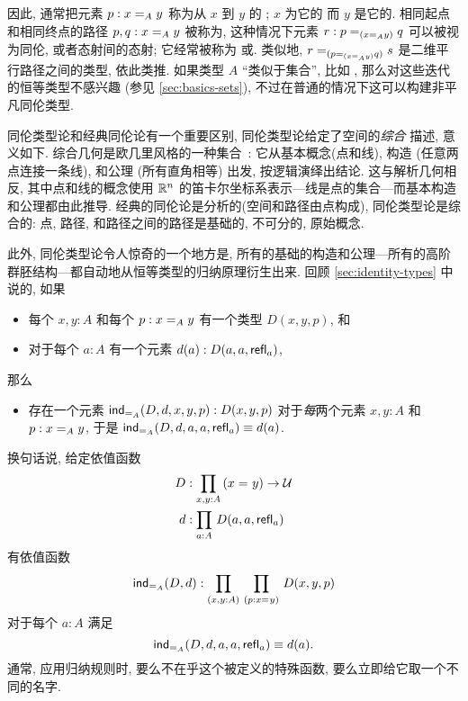 因此, 通常把元素 $p : \id[A]{x}{y}$ 称为从 $x$ 到 $y$ 的 ;
%
$x$ 为它的%
%
%
而 $y$ 是它的.
%
%
相同起点和相同终点的路径 $p,q : \id[A]{x}{y}$ 被称为,
%
%
这种情况下元素 $r : \id[{(\id[A]{x}{y})}]{p}{q}$ 可以被视为同伦, 或者态射间的态射;
它经常被称为%
%
%
或.
%
%
%
类似地, $\id[{(\id[{(\id[A]{x}{y})}]{p}{q})}]{r}{s}$ 是二维平行路径之间的类型,
%
依此类推.
如果类型 $A$ ``类似于集合'', 比如 \nat, 那么对这些迭代的恒等类型不感兴趣 (参见 \cref{sec:basics-sets}), 不过在普通的情况下这可以构建非平凡同伦类型.


同伦类型论和经典同伦论有一个重要区别, 同伦类型论给定了空间的\emph{综合}%
%
%
%
描述, 意义如下.
综合几何是欧几里风格的一种集合~\cite{Euclid}: 它从基本概念(点和线), 构造 (任意两点连接一条线), 和公理 (所有直角相等) 出发, 按逻辑演绎出结论.
这与解析几何相反,
%
其中点和线的概念使用 $\R^n$ 的笛卡尔坐标系表示---线是点的集合---而基本构造和公理都由此推导.
经典的同伦论是分析的(空间和路径由点构成), 同伦类型论是综合的: 点, 路径, 和路径之间的路径是基础的, 不可分的, 原始概念.

此外, 同伦类型论令人惊奇的一个地方是, 所有的基础的构造和公理---所有的高阶群胚结构---都自动地从恒等类型的归纳原理衍生出来.
回顾 \cref{sec:identity-types} 中说的, 如果
\begin{itemize}
    \item 每个 $x,y:A$ 和每个 $p:\id[A]xy$ 有一个类型 $D(x,y,p)$, 和
    \item 对于每个 $a:A$ 有一个元素 $d(a):D(a,a,\refl a)$,
\end{itemize}
那么
\begin{itemize}
    \item 存在一个元素 $\indid{A}(D,d,x,y,p):D(x,y,p)$ 对于\emph{每}两个元素 $x,y:A$ 和 $p:\id[A]xy$, 于是 $\indid{A}(D,d,a,a,\refl a) \jdeq d(a)$.
\end{itemize}
换句话说, 给定依值函数
\begin{align*}
    D &:\prd{x,y:A} (\id{x}{y}) \to \type\\
    d &:\prd{a:A} D(a,a,\refl{a})
\end{align*}
有依值函数
\[
    \indid{A}(D,d):\prd{x,y:A}{p:\id{x}{y}} D(x,y,p)
\]
对于每个 $a:A$ 满足
\begin{equation}
    \label{eq:Jconv}
    \indid{A}(D,d,a,a,\refl{a})\jdeq d(a).
\end{equation}
通常, 应用归纳规则时, 要么不在乎这个被定义的特殊函数, 要么立即给它取一个不同的名字.

